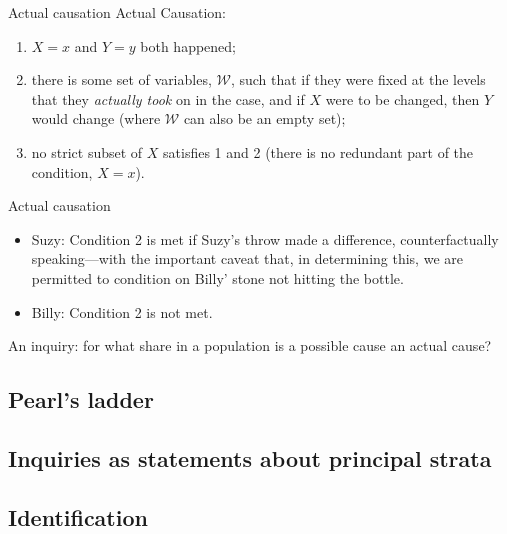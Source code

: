 \documentclass[
  11pt,
  ignorenonframetext,
]{beamer}
\providecommand{\tightlist}{%
  \setlength{\itemsep}{0pt}\setlength{\parskip}{0pt}}\usepackage{longtable,booktabs,array}
\begin{document}
\begin{frame}{Actual causation}
\protect\hypertarget{actual-causation-1}{}
Actual Causation:

\begin{enumerate}
\tightlist
\item
  \(X=x\) and \(Y=y\) both happened;
\item
  there is some set of variables, \(\mathcal W\), such that if they were
  fixed at the levels that they \emph{actually took} on in the case, and
  if \(X\) were to be changed, then \(Y\) would change (where
  \(\mathcal W\) can also be an empty set);
\item
  no strict subset of \(X\) satisfies 1 and 2 (there is no redundant
  part of the condition, \(X=x\)).
\end{enumerate}
\end{frame}

\begin{frame}{Actual causation}
\protect\hypertarget{actual-causation-2}{}
\begin{itemize}
\tightlist
\item
  Suzy: Condition 2 is met if Suzy's throw made a difference,
  counterfactually speaking---with the important caveat that, in
  determining this, we are permitted to condition on Billy' stone not
  hitting the bottle.
\item
  Billy: Condition 2 is not met.
\end{itemize}

An inquiry: for what share in a population is a possible cause an actual
cause?
\end{frame}

\hypertarget{pearls-ladder}{%
\subsection{Pearl's ladder}\label{pearls-ladder}}

\hypertarget{inquiries-as-statements-about-principal-strata}{%
\subsection{Inquiries as statements about principal
strata}\label{inquiries-as-statements-about-principal-strata}}

\hypertarget{identification}{%
\subsection{Identification}\label{identification}}
\end{document}
